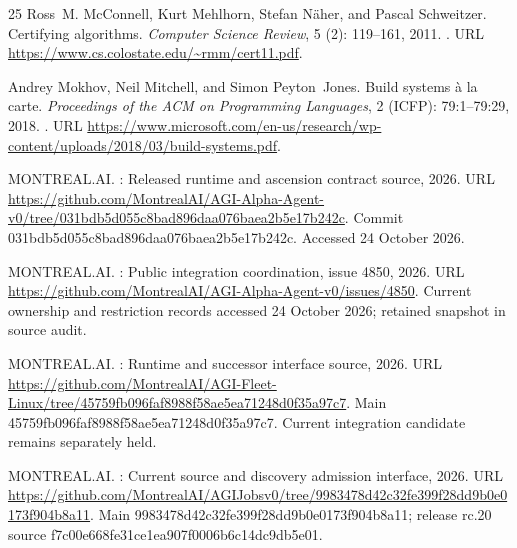 \documentclass[11pt]{article}
\begin{document}
\begin{thebibliography}{25}
Ross~M. McConnell, Kurt Mehlhorn, Stefan N{\"a}her, and Pascal Schweitzer.
\newblock Certifying algorithms.
\newblock \emph{Computer Science Review}, 5 (2): 119--161,
  2011.
\newblock {}.
\newblock URL \url{https://www.cs.colostate.edu/~rmm/cert11.pdf}.

Andrey Mokhov, Neil Mitchell, and Simon Peyton~Jones.
\newblock Build systems {\`a} la carte.
\newblock \emph{Proceedings of the ACM on Programming Languages}, 2
  (ICFP): 79:1--79:29, 2018.
\newblock {}.
\newblock URL
  \url{https://www.microsoft.com/en-us/research/wp-content/uploads/2018/03/build-systems.pdf}.

{MONTREAL.AI}.
: Released runtime and ascension contract source,
  2026{}.
\newblock URL
  \url{https://github.com/MontrealAI/AGI-Alpha-Agent-v0/tree/031bdb5d055c8bad896daa076baea2b5e17b242c}.
\newblock Commit 031bdb5d055c8bad896daa076baea2b5e17b242c. Accessed 24 October
  2026.

{MONTREAL.AI}.
: Public integration coordination, issue 4850,
  2026{}.
\newblock URL
  \url{https://github.com/MontrealAI/AGI-Alpha-Agent-v0/issues/4850}.
\newblock Current ownership and restriction records accessed 24 October 2026;
  retained snapshot in source audit.

{MONTREAL.AI}.
: Runtime and successor interface source,
  2026{}.
\newblock URL
  \url{https://github.com/MontrealAI/AGI-Fleet-Linux/tree/45759fb096faf8988f58ae5ea71248d0f35a97c7}.
\newblock Main 45759fb096faf8988f58ae5ea71248d0f35a97c7. Current integration
  candidate remains separately held.

{MONTREAL.AI}.
: Current source and discovery admission interface,
  2026{}.
\newblock URL
  \url{https://github.com/MontrealAI/AGIJobsv0/tree/9983478d42c32fe399f28dd9b0e0173f904b8a11}.
\newblock Main 9983478d42c32fe399f28dd9b0e0173f904b8a11; release rc.20 source
  f7c00e668fe31ce1ea907f0006b6c14dc9db5e01.


\end{thebibliography}
\end{document}
